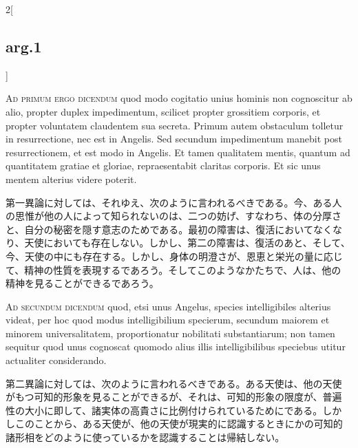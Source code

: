 \documentclass[paper=a4paper,fontsize=10pt,jafontsize=9pt,titlepage]{jlreq}
\begin{document}
\begin{paracol}{2}[\subsection{arg.1}]
\switchcolumn*[\subsection{ad.1}]

{\scshape Ad primum ergo dicendum} quod modo cogitatio unius hominis
non cognoscitur ab alio, propter duplex impedimentum, scilicet propter
grossitiem corporis, et propter voluntatem claudentem sua
secreta. Primum autem obstaculum tolletur in resurrectione, nec est in
Angelis. Sed secundum impedimentum manebit post resurrectionem, et est
modo in Angelis. Et tamen qualitatem mentis, quantum ad quantitatem
gratiae et gloriae, repraesentabit claritas corporis. Et sic unus
mentem alterius videre poterit.

\switchcolumn

第一異論に対しては、それゆえ、次のように言われるべきである。今、ある人
の思惟が他の人によって知られないのは、二つの妨げ、すなわち、体の分厚さ
と、自分の秘密を隠す意志のためである。最初の障害は、復活においてなくな
り、天使においても存在しない。しかし、第二の障害は、復活のあと、そして、
今、天使の中にも存在する。しかし、身体の明澄さが、恩恵と栄光の量に応じ
て、精神の性質を表現するであろう。そしてこのようなかたちで、人は、他の
精神を見ることができるであろう。

\switchcolumn*[\subsection{ad.2}]

{\scshape Ad secundum dicendum} quod, etsi unus Angelus, species
intelligibiles alterius videat, per hoc quod modus intelligibilium
specierum, secundum maiorem et minorem universalitatem, proportionatur
nobilitati substantiarum; non tamen sequitur quod unus cognoscat
quomodo alius illis intelligibilibus speciebus utitur actualiter
considerando.

\switchcolumn

第二異論に対しては、次のように言われるべきである。ある天使は、他の天使
がもつ可知的形象を見ることができるが、それは、可知的形象の限度が、普遍
性の大小に即して、諸実体の高貴さに比例付けられているためにである。しか
しこのことから、ある天使が、他の天使が現実的に認識するときにかの可知的
諸形相をどのように使っているかを認識することは帰結しない。

\switchcolumn*[\subsection{ad.3}]


\end{paracol}
\end{document}

